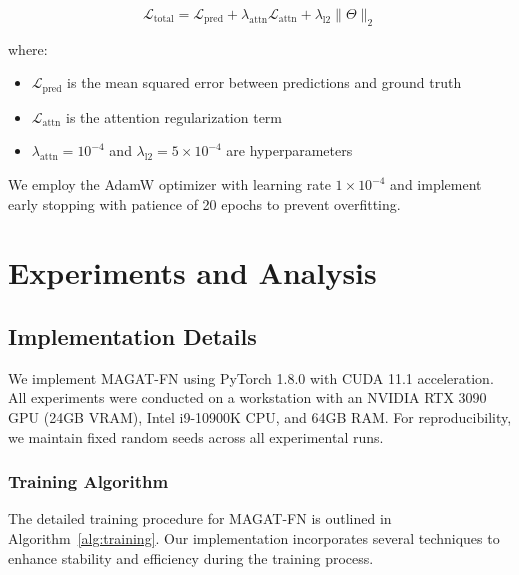 \documentclass[lettersize, journal]{IEEEtran}
\begin{document}
\begin{equation}
\mathcal{L}_{\text{total}} = \mathcal{L}_{\text{pred}} + \lambda_{\text{attn}}\mathcal{L}_{\text{attn}} + \lambda_{\text{l2}}\|\Theta\|_2
\end{equation}

where:
\begin{itemize}
    \item $\mathcal{L}_{\text{pred}}$ is the mean squared error between predictions and ground truth
    \item $\mathcal{L}_{\text{attn}}$ is the attention regularization term
    \item $\lambda_{\text{attn}} = 10^{-4}$ and $\lambda_{\text{l2}} = 5 \times 10^{-4}$ are hyperparameters
\end{itemize}

We employ the AdamW optimizer with learning rate $1 \times 10^{-4}$ and implement early stopping with patience of 20 epochs to prevent overfitting.

\section{Experiments and Analysis}

\subsection{Implementation Details}
We implement MAGAT-FN using PyTorch 1.8.0 with CUDA 11.1 acceleration. All experiments were conducted on a workstation with an NVIDIA RTX 3090 GPU (24GB VRAM), Intel i9-10900K CPU, and 64GB RAM. For reproducibility, we maintain fixed random seeds across all experimental runs.

\subsubsection{Training Algorithm}
The detailed training procedure for MAGAT-FN is outlined in Algorithm~\ref{alg:training}. Our implementation incorporates several techniques to enhance stability and efficiency during the training process.
\end{document}

